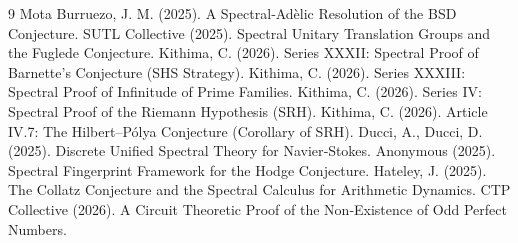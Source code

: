 \documentclass[11pt,a4paper]{article}
\begin{document}

\begin{thebibliography}{9}
  Mota Burruezo, J. M. (2025). A Spectral‑Adèlic Resolution of the BSD Conjecture.
  SUTL Collective (2025). Spectral Unitary Translation Groups and the Fuglede Conjecture.
  Kithima, C. (2026). Series XXXII: Spectral Proof of Barnette's Conjecture (SHS Strategy).
  Kithima, C. (2026). Series XXXIII: Spectral Proof of Infinitude of Prime Families.
  Kithima, C. (2026). Series IV: Spectral Proof of the Riemann Hypothesis (SRH).
  Kithima, C. (2026). Article IV.7: The Hilbert–Pólya Conjecture (Corollary of SRH).
  Ducci, A., Ducci, D. (2025). Discrete Unified Spectral Theory for Navier‑Stokes.
  Anonymous (2025). Spectral Fingerprint Framework for the Hodge Conjecture.
  Hateley, J. (2025). The Collatz Conjecture and the Spectral Calculus for Arithmetic Dynamics.
  CTP Collective (2026). A Circuit Theoretic Proof of the Non‑Existence of Odd Perfect Numbers.
\end{thebibliography}
\end{document}
